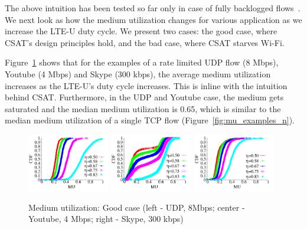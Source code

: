 The above intuition has been tested so far only in case of fully backlogged flows~\cite{qualcommpresentation}. 
We next look as how the medium utilization changes for various application as we increase the LTE-U duty cycle. 
We present two cases: the good case, where CSAT's design principles hold, and the bad case, where CSAT starves Wi-Fi. 

Figure~\ref{fig:csat_mu_good} shows that for the examples of a rate limited UDP flow (8 Mbps), Youtube (4 Mbps) and Skype (300 kbps), the average medium utilization increases as the LTE-U's duty cycle increases. 
This is inline with the intuition behind CSAT. 
Furthermore, in the UDP and Youtube case, the medium gets saturated and the median medium utilization is 0.65, which is similar to the median medium utilization of a single TCP flow (Figure~\ref{fig:mu_examples_n}).

\begin{figure}[htb!]
 \centering
    \includegraphics[width=0.32\textwidth]{./figures/csat_mu_udp8mbps}
    \includegraphics[width=0.32\textwidth]{./figures/youtube_80211bg}
    \includegraphics[width=0.32\textwidth]{./figures/skype_80211bg}
 \caption{Medium utilization: Good case (left - UDP, 8Mbps; center - Youtube, 4 Mbps; right - Skype, 300 kbps) }
  \label{fig:csat_mu_good}
\end{figure}



